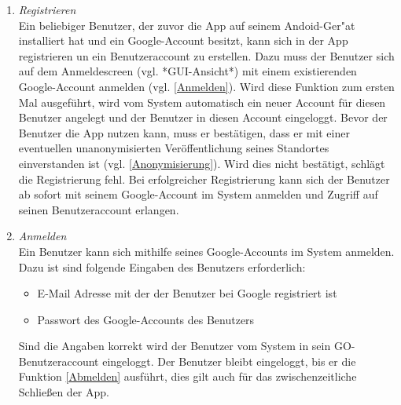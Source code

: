 \documentclass[parskip=full]{scrartcl}
\def\threedigits#1{%
  \ifnum#1<100 0\fi
  \ifnum#1<10 0\fi
  \number#1}
\begin{document}
\begin{enumerate}[label={\textbf{/F\protect\threedigits{\theenumi}0/}}, leftmargin=*]
	
	\item \textit{Registrieren}\label{Registrieren} \\ Ein beliebiger Benutzer, der zuvor die App auf seinem Andoid-Ger"at installiert hat und ein Google-Account besitzt, kann sich in der App registrieren un ein Benutzeraccount zu erstellen. Dazu muss der Benutzer sich auf dem Anmeldescreen (vgl. *GUI-Ansicht*) mit einem existierenden Google-Account anmelden (vgl. \ref{Anmelden}). Wird diese Funktion zum ersten Mal ausgeführt, wird vom System automatisch ein neuer Account für diesen Benutzer angelegt und der Benutzer in diesen Account eingeloggt. Bevor der Benutzer die App nutzen kann, muss er bestätigen, dass er mit einer eventuellen unanonymisierten Veröffentlichung seines Standortes einverstanden ist (vgl. \ref{Anonymisierung}). Wird dies nicht bestätigt, schlägt die Registrierung fehl.
	Bei erfolgreicher Registrierung kann sich der Benutzer ab sofort mit seinem Google-Account im System anmelden und Zugriff auf seinen Benutzeraccount erlangen.

	 	
	\item \textit{Anmelden} \label{Anmelden} \\ Ein Benutzer kann sich mithilfe seines Google-Accounts im System anmelden. Dazu ist sind folgende Eingaben des Benutzers erforderlich:
	\begin{itemize}
		\item E-Mail Adresse mit der der Benutzer bei Google registriert ist
		\item Passwort des Google-Accounts des Benutzers
	\end{itemize}
	Sind die Angaben korrekt wird der Benutzer vom System in sein GO-Benutzeraccount eingeloggt. Der Benutzer bleibt eingeloggt, bis er die Funktion \ref{Abmelden} ausführt, dies gilt auch für das zwischenzeitliche Schließen der App.
	
	

\end{enumerate}
\end{document}
